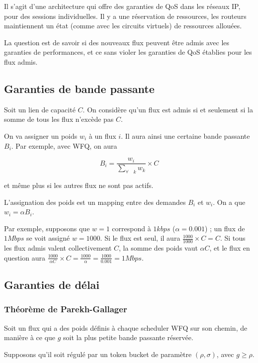 \documentclass[10pt,a4paper]{report}
\begin{document}
			Il s'agit d'une architecture qui offre des garanties de QoS dans les réseaux IP, pour des sessions individuelles. Il y a une réservation de ressources, les routeurs maintiennent un état (comme avec les circuits virtuels) de ressources allouées.
			
			La question est de savoir si des nouveaux flux peuvent être admis avec les garanties de performances, et ce sans violer les garanties de QoS établies pour les flux admis.
		
		\subsection{Garanties de bande passante}
		
		Soit un lien de capacité $C$. On considère qu'un flux est admis si et seulement si la somme de tous les flux n'excède pas $C$.
		
		On va assigner un poids $w_i$ à un flux $i$. Il aura ainsi une certaine bande passante $B_i$. Par exemple, avec WFQ, on aura
		
		$$B_i = \frac{w_i}{\sum_{\forall \quad k} w_k} \times C$$
		
		et même plus si les autres flux ne sont pas actifs.
		
		L'assignation des poids est un mapping entre des demandes $B_i$ et $w_i$. On a que $w_i = \alpha B_i$.
		
		Par exemple, supposons que $w=1$ correspond à $1kbps$ ($\alpha = 0.001$) ; un flux de $1Mbps$ se voit assigné $w = 1000$. Si le flux est seul, il aura $\frac{1000}{1000} \times C = C$. Si tous les flux admis valent collectivement $C$, la somme des poids vaut $\alpha C$, et le flux en question aura $\frac{1000}{\alpha C} \times C = \frac{1000}{\alpha} = \frac{1000}{0.001} = 1Mbps$.
		
		
		\subsection{Garanties de délai}
		
			\subsubsection{Théorème de Parekh-Gallager}
			
			Soit un flux qui a des poids définis à chaque scheduler WFQ sur son chemin, de manière à ce que $g$ soit la plus petite bande passante réservée.
			
			Supposons qu'il soit régulé par un token bucket de paramètre $(\rho, \sigma)$, avec $g \geq \rho$.
			
\end{document}

